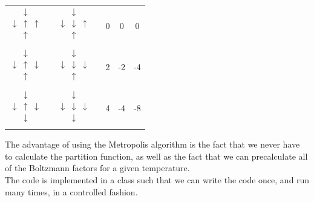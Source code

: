 \documentclass[%
 reprint,
nofootinbib,
aps,
]{revtex4-1}
\begin{document}
\begin{table}[]
\begin{tabular}{@{}ccccc@{}}
$\begin{matrix}& \downarrow & \\ \downarrow & \uparrow & \uparrow \\ & \uparrow & \\ & & & \end{matrix}$     & $\begin{matrix}& \downarrow & \\ \downarrow & \downarrow & \uparrow \\ & \uparrow & \\ & & & \end{matrix}$ & 0 & 0   & 0                  \\
$\begin{matrix}& \downarrow & \\ \downarrow & \uparrow & \downarrow \\ & \uparrow & \\ & & & \end{matrix}$   & $\begin{matrix}& \downarrow & \\ \downarrow & \downarrow & \downarrow \\ & \uparrow & \\ & & & \end{matrix}$ & 2& -2  & -4                 \\
$\begin{matrix}& \downarrow & \\ \downarrow & \uparrow & \downarrow \\ & \downarrow & \\ & & & \end{matrix}$ & $\begin{matrix}& \downarrow & \\ \downarrow & \downarrow & \downarrow \\ & \downarrow & \\ & & & \end{matrix}$ & 4 & -4 & -8                 \\ \bottomrule
\end{tabular}
\end{table}\par
The advantage of using the Metropolis algorithm is the fact that we never have to calculate the partition function, as well as the fact that we can precalculate all of the Boltzmann factors for a given temperature.\\
The code is implemented in a class such that we can write the code once, and run many times, in a controlled fashion.
\end{document}
